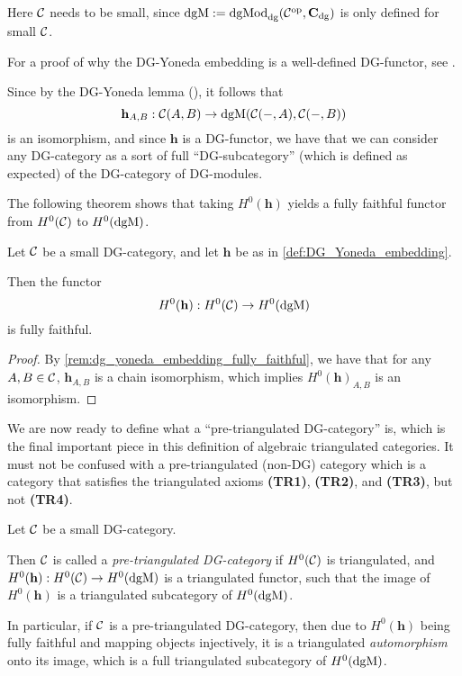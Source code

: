Here \( {\mathcal{C}} \) needs to be small, since \( \operatorname{dgM} := \operatorname{dgMod}_{\operatorname{dg}}({\mathcal{C}}^{\operatorname{op}}, \operatorname{\mathbf{C}}_{\operatorname{dg}}) \) is only defined for small \( {\mathcal{C}} \).

For a proof of why the DG-Yoneda embedding is a well-defined DG-functor, see \cite[Corollary 6.3.6]{Borceux_1994}.

\begin{remark}
    \label{rem:dg_yoneda_embedding_fully_faithful}
    Since by the DG-Yoneda lemma (\cite[Corollary 6.3.5]{Borceux_1994}), it follows that
    \[
        \mathbf{h}_{A, B}: {\mathcal{C}}(A, B) \to \operatorname{dgM}({\mathcal{C}}(-, A), {\mathcal{C}}(-, B))
    \]
    is an isomorphism, and since \( \mathbf{h} \) is a DG-functor, we have that we can consider any DG-category as a sort of full ``DG-subcategory'' (which is defined as expected) of the DG-category of DG-modules.
\end{remark}

The following theorem shows that taking \( H^0(\mathbf{h}) \) yields a fully faithful functor from \( H^0({\mathcal{C}}) \) to \( H^0(\operatorname{dgM}) \).

\begin{lemma}
    Let \( {\mathcal{C}} \) be a small DG-category, and let \( \mathbf{h} \) be as in \autoref{def:DG_Yoneda_embedding}.

    Then the functor
    \[
        H^0(\mathbf{h}): H^0({\mathcal{C}}) \to H^0(\operatorname{dgM})
    \]
    is fully faithful.
\end{lemma}
\begin{proof}
    By \autoref{rem:dg_yoneda_embedding_fully_faithful}, we have that for any \( A, B \in {\mathcal{C}} \), \( \mathbf{h}_{A, B} \) is a chain isomorphism, which implies \( H^0(\mathbf{h})_{A, B} \) is an isomorphism.
\end{proof}

We are now ready to define what a ``pre-triangulated DG-category'' is, which is the final important piece in this definition of algebraic triangulated categories. It must not be confused with a pre-triangulated (non-DG) category which is a category that satisfies the triangulated axioms {\bf (TR1)}, {\bf (TR2)}, and {\bf (TR3)}, but not {\bf (TR4)}.
\begin{definition}
    \label{def:pre-tri_dg_cat}
    Let \( {\mathcal{C}} \) be a small DG-category.

    Then \( {\mathcal{C}} \) is called a \emph{pre-triangulated DG-category} if \( H^0({\mathcal{C}}) \) is triangulated, and \( H^0(\mathbf{h}): H^0({\mathcal{C}}) \to H^0(\operatorname{dgM}) \) is a triangulated functor, such that the image of \( H^0(\mathbf{h}) \) is a triangulated subcategory of \( H^0(\operatorname{dgM}) \).
\end{definition}
In particular, if \( {\mathcal{C}} \) is a pre-triangulated DG-category, then due to \( H^0(\mathbf{h}) \) being fully faithful and mapping objects injectively, it is a triangulated \emph{automorphism} onto its image, which is a full triangulated subcategory of \( H^0(\operatorname{dgM}) \).

